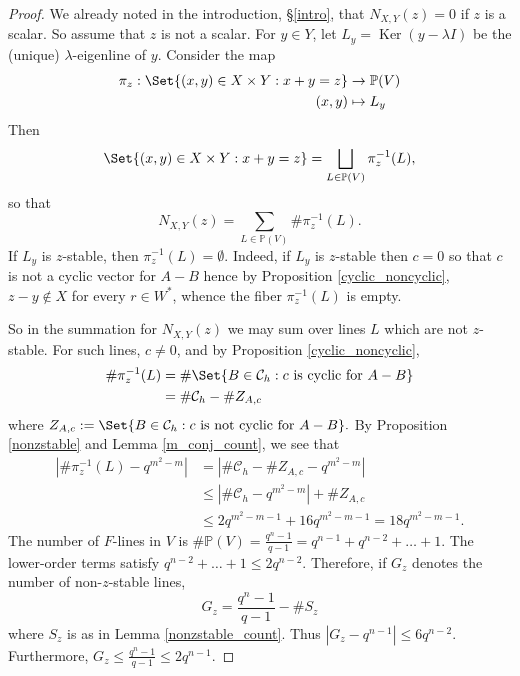 \documentclass[preprint,11pt]{amsart}
\def\P{\mathbb{P}}
\newcommand{\CalC}{\mathcal{C}}
\theoremstyle{definition}
\numberwithin{thm}{section}
\newcommand{\Ker}{\operatorname{Ker}}
\newcommand{\abs}[1]{\left| #1 \right|}
\newcommand{\trm}[1]{\textrm{#1}}
\newcommand{\lam}{\lambda}
\begin{document}
\begin{proof}
We already noted in the introduction, \S \ref{intro}, that $N_{X, Y}(z)= 0$ if $z$ is a scalar. So assume that $z$ is not a scalar. For $y \in Y$, let $L_y = \Ker(y - \lam I)$ be the (unique) $\lam$-eigenline of $y$. Consider the map 
\begin{align*}
\pi_z: \Set{ (x,y) \in X \times Y : x + y = z}  &\to \P(V)\\
(x,y) &\mapsto L_y
\end{align*}
Then
$$
\Set{ (x,y) \in X \times Y : x + y = z} = \bigsqcup_{L \in \P(V)} \pi_z^{-1}(L),
$$
so that  
$$
N_{X, Y}(z) = \sum_{L \in \P(V)} \# \pi_z^{-1}(L).
$$
If $L_y$ is $z$-stable, then $\pi_z^{-1}(L) = \emptyset$.  Indeed, if $L_y$ is $z$-stable then $c = 0$ so that $c$ is not a cyclic vector for $A-B$ hence by Proposition \ref{cyclic_noncyclic}, $z-y \not \in X$ for every $r \in W^*$, whence the fiber $\pi_z^{-1}(L)$ is empty. 

So in the summation for $N_{X, Y}(z)$ we may sum over lines $L$ which are not $z$-stable. For such lines, $c \neq 0$, and by Proposition \ref{cyclic_noncyclic},
\begin{align*}
\#\pi_z^{-1}(L) &= \# \Set{B \in \CalC_h : c \trm{ is cyclic for } A - B}\\
& = \# \CalC_h - \#Z_{A,c}
\end{align*}
where  $Z_{A,c}:= \Set{ B \in \CalC_h : c \trm{ is not cyclic for } A - B}.$
By Proposition \ref{nonzstable} and Lemma \ref{m_conj_count}, we see that 
\begin{align*}
\abs{\# \pi_z^{-1}(L)  - q^{m^2 -m}} &= \abs{ \# \CalC_h - \# Z_{A,c} - q^{m^2 -m}} \\
&\leq \abs{\#\CalC_h - q^{m^2-m}} + \#Z_{A,c} \\
& \leq 2 q^{m^2-m-1} + 16 q^{m^2 - m-1} = 18q^{m^2 - m -1}.
\end{align*}
\noindent The number of $F$-lines in $V$  is $\#\P(V) = \frac{q^n-1}{q-1} = q^{n-1} + q^{n-2} + \ldots +1$. The lower-order terms satisfy $q^{n-2} + \ldots + 1 \leq 2 q^{n-2}$. Therefore, if $G_z$ denotes the number of non-$z$-stable lines, 
$$
G_z = \frac{q^n -1 }{q-1} - \#S_z
$$
where $S_z$ is as in Lemma \ref{nonzstable_count}. Thus $\abs{G_z - q^{n-1}} \leq 6 q^{n-2}$. Furthermore, $G_z \leq \frac{q^n - 1}{q-1} \leq 2 q^{n-1}$.
 

\end{proof}
\end{document}
